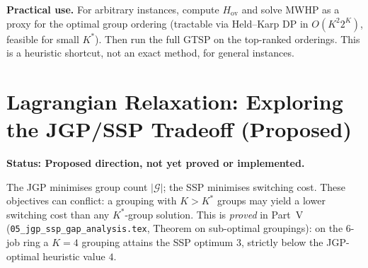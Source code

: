 \documentclass[11pt,a4paper]{article}
\theoremstyle{plain}
\theoremstyle{definition}
\newcommand{\Kstar}{K^*}
\newcommand{\calG}{\mathcal{G}}
\begin{document}
\noindent\textbf{Practical use.}
For arbitrary instances, compute $H_\mathrm{ov}$ and solve MWHP as a proxy for
the optimal group ordering (tractable via Held--Karp DP in $O(K^2 2^K)$, feasible
for small $K^*$). Then run the full GTSP on the top-ranked orderings. This is
a heuristic shortcut, not an exact method, for general instances.

\section{Lagrangian Relaxation: Exploring the JGP/SSP Tradeoff (Proposed)}
\label{sec:lagrangian}

\begin{propbox}
\textbf{Status: Proposed direction, not yet proved or implemented.}
\end{propbox}

The JGP minimises group count $|\calG|$; the SSP minimises switching cost.
These objectives can conflict: a grouping with $K > \Kstar$ groups may yield
a lower switching cost than any $\Kstar$-group solution. This is \emph{proved} in
Part~V (\texttt{05\_jgp\_ssp\_gap\_analysis.tex}, Theorem on sub-optimal groupings):
on the $6$-job ring a $K{=}4$ grouping attains the SSP optimum $3$, strictly below the
JGP-optimal heuristic value $4$.
\end{document}
